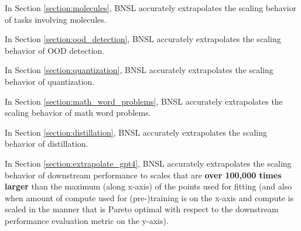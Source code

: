 \documentclass{article} %
\begin{document}
\vspace{-2.1mm}

In Section \ref{section:molecules}, BNSL accurately extrapolates the scaling behavior of tasks involving molecules.

\vspace{-2.1mm}

In Section \ref{section:ood_detection}, BNSL accurately extrapolates the scaling behavior of OOD detection.

\vspace{-2.1mm}

In Section \ref{section:quantization}, BNSL accurately extrapolates the scaling behavior of quantization.

\vspace{-2.1mm}

In Section \ref{section:math_word_problems}, BNSL accurately extrapolates the scaling behavior of math word problems.

\vspace{-2.1mm}

In Section \ref{section:distillation}, BNSL accurately extrapolates the scaling behavior of distillation.

\vspace{-2.1mm}

In Section \ref{section:extrapolate_gpt4}, BNSL accurately extrapolates the scaling behavior of downstream performance to scales that are \textbf{over 100,000 times larger} than the maximum (along x-axis) of the points used for fitting (and also when amount of compute used for (pre-)training is on the x-axis and compute is scaled in the manner that is Pareto optimal with respect to the downstream performance evaluation metric on the y-axis).

\vspace{-1.6mm}


\iffalse
\end{document}
